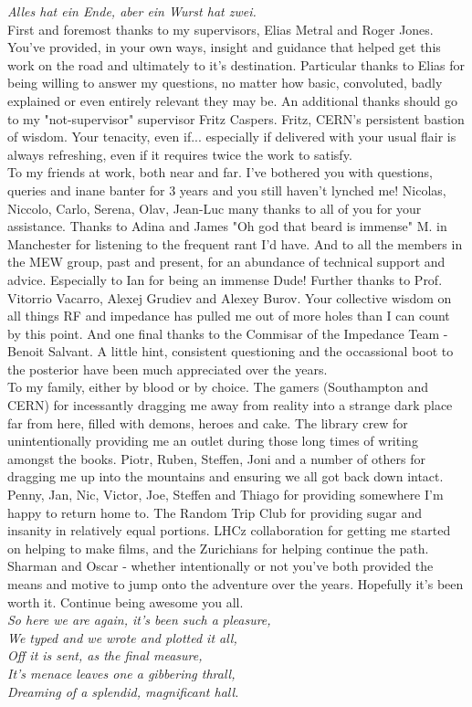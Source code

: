 \emph{Alles hat ein Ende, aber ein Wurst hat zwei.}
\\
First and foremost thanks to my supervisors, Elias Metral and Roger Jones. You've provided, in your own ways, insight and guidance that helped get this work on the road and ultimately to it's destination. Particular thanks to Elias for being willing to answer my questions, no matter how basic, convoluted, badly explained or even entirely relevant they may be. An additional thanks should go to my "not-supervisor" supervisor Fritz Caspers. Fritz, CERN's persistent bastion of wisdom. Your tenacity, even if... especially if delivered with your usual flair is always refreshing, even if it requires twice the work to satisfy.
\\
To my friends at work, both near and far. I've bothered you with questions, queries and inane banter for 3 years and you still haven't lynched me! Nicolas, Niccolo, Carlo, Serena, Olav, Jean-Luc many thanks to all of you for your assistance. Thanks to Adina and James "Oh god that beard is immense" M. in Manchester for listening to the frequent rant I'd have. And to all the members in the MEW group, past and present, for an abundance of technical support and advice. Especially to Ian for being an immense Dude! Further thanks to Prof. Vitorrio Vacarro, Alexej Grudiev and Alexey Burov. Your collective wisdom on all things RF and impedance has pulled me out of more holes than I can count by this point. And one final thanks to the Commisar of the Impedance Team - Benoit Salvant. A little hint, consistent questioning and the occassional boot to the posterior have been much appreciated over the years.
\\
To my family, either by blood or by choice. The gamers (Southampton and CERN) for incessantly dragging me away from reality into a strange dark place far from here, filled with demons, heroes and cake. The library crew for unintentionally providing me an outlet during those long times of writing amongst the books. Piotr, Ruben, Steffen, Joni and a number of others for dragging me up into the mountains and ensuring we all got back down intact. Penny, Jan, Nic, Victor, Joe, Steffen and Thiago for providing somewhere I'm happy to return home to. The Random Trip Club for providing sugar and insanity in relatively equal portions. LHCz collaboration for getting me started on helping to make films, and the Zurichians for helping continue the path. Sharman and Oscar - whether intentionally or not you've both provided the means and motive to jump onto the adventure over the years. Hopefully it's been worth it. Continue being awesome you all.
\\
\emph{So here we are again, it's been such a pleasure,
\\
We typed and we wrote and plotted it all,
\\ 
Off it is sent, as the final measure,
\\
It's menace leaves one a gibbering thrall,
\\
Dreaming of a splendid, magnificant hall.}